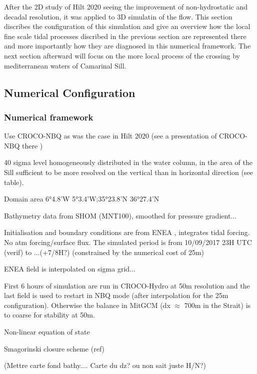 After the 2D study of Hilt 2020 seeing the improvement of non-hydrostatic and decadal resolution, it was applied to 3D simulatin of the flow. This section discribes the configuration of this simulation and give an overview how the local fine scale tidal processes discribed in the previous section are represented there and more importantly how they are diagnosed in this numerical framework. The next section afterward will focus on the more local process of the crossing by mediterranean waters of Camarinal Sill.



\subsection{Numerical Configuration}
\subsubsection{Numerical framework}

Use CROCO-NBQ as was the case in Hilt 2020 (see a presentation of CROCO-NBQ there ) 

40 sigma level homogeneously distributed in the water column, in the area of the Sill sufficient to be more resolved on the vertical than in horizontal direction (see table).

Domain area 6°4.8'W  5°3.4'W;35°23.8'N  36°27.4'N 

Bathymetry data from SHOM (MNT100), smoothed for pressure gradient...

Initialisation and boundary conditions are from ENEA , integrates tidal forcing. No atm forcing/surface flux. The simulated period is from 10/09/2017 23H UTC (verif) to ...(+7/8H?) (constrained by the numerical cost of 25m)

ENEA field is interpolated on sigma grid...

First 6 hours of simulation are run in CROCO-Hydro at 50m resolution and the last field is used to restart in NBQ mode (after interpolation for the 25m configuration). Otherwise the balance in MitGCM (dx $\approx$ 700m in the Strait) is to coarse for stability at 50m.

Non-linear equation of state

Smagorinski closure scheme (ref)

(Mettre carte fond bathy.... Carte du dz? ou non sait juste H/N?)


